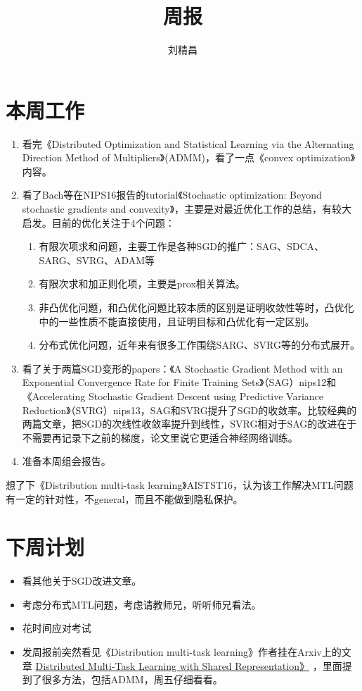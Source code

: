 \documentclass{article}
\begin{document}
\title{周报}
\author{刘精昌}
\maketitle

\section*{本周工作}
\begin{enumerate}
  \item 看完《Distributed Optimization and Statistical Learning via the Alternating Direction Method of Multipliers》(ADMM)，看了一点《convex optimization》内容。
  \item 看了Bach等在NIPS16报告的tutorial《Stochastic optimization: Beyond stochastic gradients and convexity》，主要是对最近优化工作的总结，有较大启发。目前的优化关注于4个问题：
      \begin{enumerate}
        \item 有限次项求和问题，主要工作是各种SGD的推广：SAG、SDCA、SARG、SVRG、ADAM等
        \item 有限次求和加正则化项，主要是prox相关算法。
        \item 非凸优化问题，和凸优化问题比较本质的区别是证明收敛性等时，凸优化中的一些性质不能直接使用，且证明目标和凸优化有一定区别。
        \item 分布式优化问题，近年来有很多工作围绕SARG、SVRG等的分布式展开。
      \end{enumerate}
  \item 看了关于两篇SGD变形的papers：《A Stochastic Gradient Method with an Exponential Convergence Rate for Finite Training Sets》（SAG）nips12和《Accelerating Stochastic Gradient Descent using Predictive Variance Reduction》（SVRG）nips13，SAG和SVRG提升了SGD的收敛率。比较经典的两篇文章，把SGD的次线性收敛率提升到线性，SVRG相对于SAG的改进在于不需要再记录下之前的梯度，论文里说它更适合神经网络训练。
  \item 准备本周组会报告。
\end{enumerate}

想了下《Distribution multi-task learning》AISTST16，认为该工作解决MTL问题有一定的针对性，不general，而且不能做到隐私保护。

\section*{下周计划}
\begin{itemize}
    \item 看其他关于SGD改进文章。
    \item 考虑分布式MTL问题，考虑请教师兄，听听师兄看法。
    \item 花时间应对考试
    \item 发周报前突然看见《Distribution multi-task learning》作者挂在Arxiv上的文章 \href{https://arxiv.org/abs/1603.02185}{Distributed Multi-Task Learning with Shared Representation》} ，里面提到了很多方法，包括ADMM，周五仔细看看。
\end{itemize}
\end{document}
